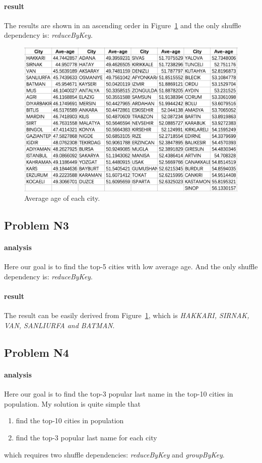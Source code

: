 \documentclass{article}
\begin{document}
\paragraph{result}
The results are shown in an ascending order in Figure~\ref{fig-1} and the only shuffle dependency is: \emph{reduceByKey}.
\begin{figure}[ht]
\centering
\includegraphics[width=0.7\linewidth]{N2}
\caption{Average age of each city.}
\label{fig-1}
\end{figure}

\subsection{Problem N3}
\paragraph{analysis}
Here our goal is to find the top-5 cities with low average age. And the only shuffle dependency is: \emph{reduceByKey}.
\paragraph{result}
The result can be easily derived from Figure~\ref{fig-1}, which is \emph{HAKKARI, SIRNAK, VAN, SANLIURFA and BATMAN}.

\subsection{Problem N4}
\paragraph{analysis}
Here our goal is to find the top-3 popular last name in the top-10 cities in population. My solution is quite simple that
\begin{enumerate}
\item find the top-10 cities in population
\item find the top-3 popular last name for each city
\end{enumerate}
which requires two shuffle dependencies: \emph{reduceByKey} and \emph{groupByKey}.
\end{document}
